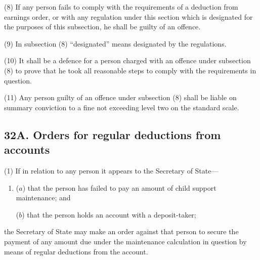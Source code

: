 \documentclass[a4paper]{article}
\begin{document}
(8)
If any person fails to comply with the requirements of a deduction from earnings order, or with any regulation under this section which is designated for the purposes of this subsection, he shall be guilty of an offence.

(9) In subsection (8) “designated” means designated by the regulations.

(10)
It shall be a defence for a person charged with an offence under subsection (8) to prove that he took all reasonable steps to comply with the requirements in question.

(11)
Any person guilty of an offence under subsection (8) shall be liable on summary conviction to a fine not exceeding level two on the standard scale.


\subsection{32A. Orders for regular deductions from accounts}

(1) If in relation to any person it appears to the Secretary of State---
\begin{enumerate}\item[]
($a$) that the person has failed to pay an amount of child support maintenance;
and

($b$) that the person holds an account with a deposit-taker;
\end{enumerate}
the Secretary of State may make an order against that person to secure the payment of any amount due under the maintenance calculation in question by means of regular deductions from the account.
\end{document}
